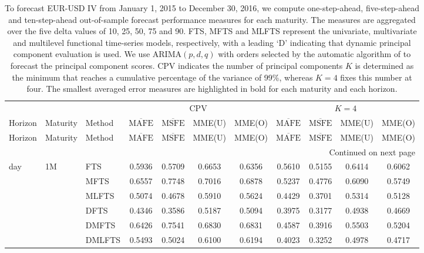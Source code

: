 \documentclass[12pt,a4paper]{article}
\begin{document}
\begin{center}
\tabcolsep 0.067in
\renewcommand{\arraystretch}{0.8}
\begin{small}
\begin{longtable}{@{}lllcccccccc@{}}
\caption{\small{To forecast EUR-USD IV from January 1, 2015 to December 30, 2016, we compute one-step-ahead, five-step-ahead and ten-step-ahead out-of-sample forecast performance measures for each maturity. The measures are aggregated over the five delta values of 10, 25, 50, 75 and 90. FTS, MFTS and MLFTS represent the univariate, multivariate and multilevel functional time-series models, respectively, with a leading `D' indicating that dynamic principal component evaluation is used. We use ARIMA$(p, d, q)$ with orders selected by the automatic algorithm of \cite{HK08} to forecast the principal component scores. CPV indicates the number of principal components $K$ is determined as the minimum that reaches a cumulative percentage of the variance of 99\%, whereas $K=4$ fixes this number at four. The smallest averaged error measures are highlighted in bold for each maturity and each horizon.}}\label{tab:4}
\\
\toprule
& &    & \multicolumn{4}{c}{CPV} & \multicolumn{4}{c}{$K = 4$} \\
Horizon & Maturity & Method& $\overline{\text{MAFE}}$ & $\overline{\text{MSFE}}$ & MME(U) & MME(O) & $\overline{\text{MAFE}}$ & $\overline{\text{MSFE}}$ & MME(U) & MME(O)  \\\hline
\endfirsthead
Horizon & Maturity & Method  & $\overline{\text{MAFE}}$ & $\overline{\text{MSFE}}$ & MME(U) & MME(O) & $\overline{\text{MAFE}}$ & $\overline{\text{MSFE}}$ & MME(U) & MME(O)   \\\hline
\endhead
\hline  \multicolumn{11}{r}{{Continued on next page}} \\ 
\endfoot
\endlastfoot
1 day &  1M & FTS & 0.5936 & 0.5709 & 0.6653 & 0.6356 & 0.5610 & 0.5155 & 0.6414 & 0.6062 \\ 
  & & MFTS & 0.6557 & 0.7748 & 0.7016 & 0.6878 & 0.5237 & 0.4776 & 0.6090 & 0.5749 \\ 
  & & MLFTS & 0.5074 & 0.4678 & 0.5910 & 0.5624 & 0.4429 & 0.3701 & 0.5314 & 0.5128 \\
  & & DFTS  & 0.4346 & 0.3586 & 0.5187 & 0.5094 & 0.3975 & 0.3177 & 0.4938 & 0.4669 \\ 
  & & DMFTS & 0.6426 & 0.7541 & 0.6830 & 0.6831 & 0.4587 & 0.3916 & 0.5503 & 0.5204 \\ 
  & & DMLFTS & 0.5493 & 0.5024 & 0.6100 & 0.6194 & 0.4023 & 0.3252 & 0.4978 & 0.4717 \\

\end{longtable}
\end{small}
\end{center}
\end{document}
